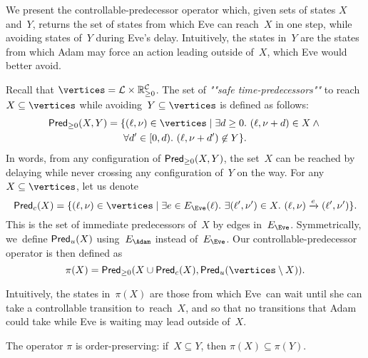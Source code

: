 We present the controllable-predecessor operator which, given sets of
states $X$ and~$Y$, returns the set of states from which Eve can
reach~$X$ in one step, while avoiding states of~$Y$ during Eve's
delay. Intuitively, the states in~$Y$ are the states from which Adam
may force an action leading outside of~$X$, which Eve would better avoid.

Recall that $\vertices = \Locs \times \Realnn^\Clocks$.
The set of \emph{""safe time-predecessors""} to reach~$X \subseteq \vertices$ while
avoiding~$Y \subseteq \vertices$
is defined as follows:
\begin{multline*}
\predt(X,Y) = \{(\ell,\nu) \in \vertices \mid \exists d\geq
    0.\ (\ell,\nu+d) \in X \wedge{} \\
    \forall d' \in[0,d).\ (\ell,\nu+d') \not  \in Y\}.
\end{multline*}
In words, from any configuration of $\mathsf{Pred}_{\geq 0}(X,Y)$,
the set~$X$ can be reached by
delaying while never crossing any configuration of~$Y$ on the way. 
For any $X \subseteq \vertices$, let us denote
\[
  \predc(X) = \{ (\ell,\nu) \in \vertices \mid \exists e \in \EE(\ell).\ 
\exists (\ell',\nu') \in X.\ (\ell,\nu) \xrightarrow{e} (\ell',\nu')\}.
\]
This is the set of immediate predecessors of~$X$ by edges in~$\EE$.
Symmetrically, we~define $\mathsf{Pred}_u(X)$ using~$\EA$ instead of~$\EE$.
Our controllable-predecessor operator is then defined as 
%
\[
  \pi(X) = \predt(X\cup \predc(X), \predu(\vertices \setminus X)).
\]

Intuitively, the states in~$\pi(X)$ are those from which Eve~can wait
until she
can take a controllable transition to~reach~$X$, and so that
no transitions that Adam could take while Eve is waiting may lead
outside of~$X$.

\begin{lemma}\label{9-lem:pimonotonic}
  The operator $\pi$ is %
  order-preserving: if~$X\subseteq Y$, then
  $\pi(X) \subseteq \pi(Y)$.  %
\end{lemma}

